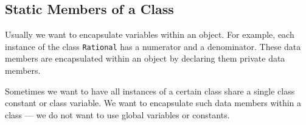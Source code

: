 
\subsection{Static Members of a Class \label{vec_static}}

Usually we want to encapsulate variables within an object. For example,
each instance of the class \verb+Rational+ has a numerator and a
denominator. These data members are encapsulated within an object
by declaring them private data members.

Sometimes we want to have all instances of a certain class share a
single class constant or class variable. We want to encapsulate 
such data members within a class --- we do not want to use global
variables or constants.

